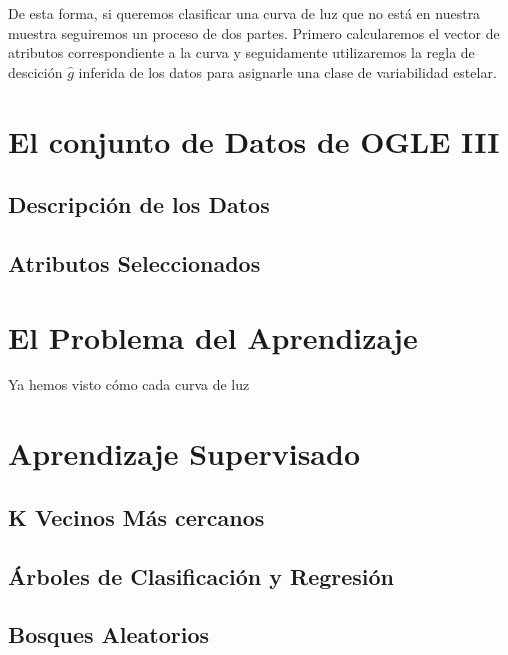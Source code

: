\documentclass[letterpaper,12pt]{book}
\begin{document}
De esta forma, si queremos clasificar una curva de luz que no está en nuestra muestra seguiremos un proceso de dos partes. Primero calcularemos el vector de atributos correspondiente a la curva y seguidamente utilizaremos la regla de descición $\hat{g}$ inferida de los datos para asignarle una clase de variabilidad estelar.


\chapter{El conjunto de Datos de OGLE III\label{cap:losDatos}}
\section{Descripción de los Datos}
\section{Atributos Seleccionados \label{sec:atributos}}

\chapter{El Problema del Aprendizaje\label{cap:problemaAprendizaje}}

Ya hemos visto cómo cada curva de luz 

\chapter{Aprendizaje Supervisado\label{cap:aprendizaje}}

\section{K Vecinos Más cercanos}

\section{Árboles de Clasificación y Regresión}

\section{Bosques Aleatorios}




\end{document}
